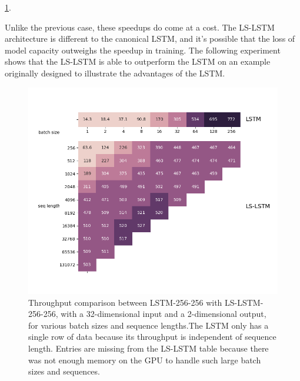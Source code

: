 \documentclass{article}
\begin{document}
\ref{fig:tp_perf}.

Unlike the previous case, these speedups do come at a cost. The LS-LSTM
architecture is different to the canonical LSTM, and it's possible that the loss
of model capacity outweighs the speedup in training. The following experiment
shows that the LS-LSTM is able to outperform the LSTM on an example originally
designed to illustrate the advantages of the LSTM.

\begin{figure}[t]
\centering
\includegraphics[width=12cm]{cudnn_heatmap.png}
\caption{Throughput comparison between LSTM-256-256 with LS-LSTM-256-256, with a
  32-dimensional input and a 2-dimensional output, for various batch sizes and
  sequence lengths.The LSTM only has a single row of data because its throughput
  is independent of sequence length. Entries are missing from the LS-LSTM table
  because there was not enough memory on the GPU to handle such large batch
  sizes and sequences.}
\label{fig:tp_perf}
\end{figure}
\end{document}
